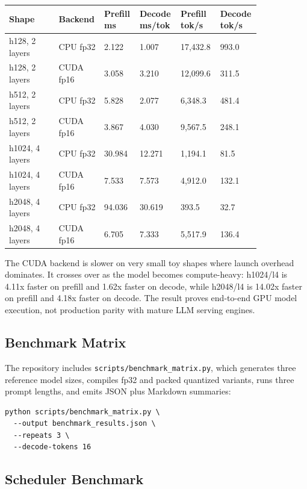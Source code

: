 \documentclass[11pt]{article}
\begin{document}
{\small
\setlength{\tabcolsep}{3pt}
\begin{longtable}{@{}p{0.19\linewidth}p{0.14\linewidth}p{0.12\linewidth}p{0.14\linewidth}p{0.12\linewidth}p{0.12\linewidth}@{}}
\toprule
\textbf{Shape} & \textbf{Backend} & \textbf{Prefill ms} & \textbf{Decode ms/tok} &
\textbf{Prefill tok/s} & \textbf{Decode tok/s} \\
\midrule
h128, 2 layers & CPU fp32 & 2.122 & 1.007 & 17,432.8 & 993.0 \\
h128, 2 layers & CUDA fp16 & 3.058 & 3.210 & 12,099.6 & 311.5 \\
h512, 2 layers & CPU fp32 & 5.828 & 2.077 & 6,348.3 & 481.4 \\
h512, 2 layers & CUDA fp16 & 3.867 & 4.030 & 9,567.5 & 248.1 \\
h1024, 4 layers & CPU fp32 & 30.984 & 12.271 & 1,194.1 & 81.5 \\
h1024, 4 layers & CUDA fp16 & 7.533 & 7.573 & 4,912.0 & 132.1 \\
h2048, 4 layers & CPU fp32 & 94.036 & 30.619 & 393.5 & 32.7 \\
h2048, 4 layers & CUDA fp16 & 6.705 & 7.333 & 5,517.9 & 136.4 \\
\bottomrule
\end{longtable}
}

The CUDA backend is slower on very small toy shapes where launch overhead
dominates. It crosses over as the model becomes compute-heavy: h1024/l4 is
4.11x faster on prefill and 1.62x faster on decode, while h2048/l4 is 14.02x
faster on prefill and 4.18x faster on decode. The result proves end-to-end GPU
model execution, not production parity with mature LLM serving engines.

\subsection{Benchmark Matrix}

The repository includes \texttt{scripts/benchmark\_matrix.py}, which generates
three reference model sizes, compiles fp32 and packed quantized variants, runs
three prompt lengths, and emits JSON plus Markdown summaries:

\begin{lstlisting}
python scripts/benchmark_matrix.py \
  --output benchmark_results.json \
  --repeats 3 \
  --decode-tokens 16
\end{lstlisting}

\subsection{Scheduler Benchmark}
\end{document}

